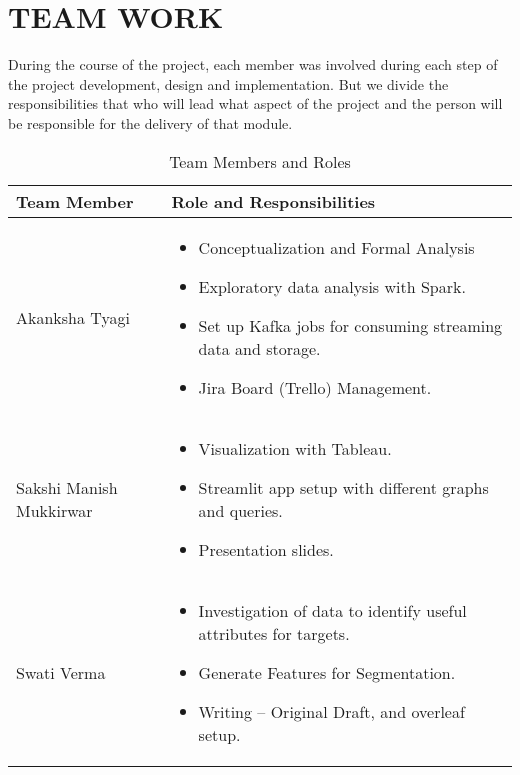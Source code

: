 \documentclass[conference]{IEEEtran}
\begin{document}


\section{TEAM WORK}

During the course of the project, each member was involved during each step of the project development, design and implementation. But we divide the responsibilities that who will lead what aspect of the project and the person will be responsible for the delivery of that module. 

\begin{table}[h]
    \renewcommand{\arraystretch}{1.3}
  \small  %
  \caption{Team Members and Roles}
  \begin{tabular}{|p{1.0in}|p{2.0in}|}
    \hline
    \textbf{Team Member} & \textbf{Role and Responsibilities} \\
    \hline
    \hline
    Akanksha Tyagi & 
        \begin{itemize}
          \item Conceptualization and Formal Analysis
          \item Exploratory data analysis with Spark.
          \item Set up Kafka jobs for consuming streaming data and storage.
          \item Jira Board (Trello) Management.
        \end{itemize}
        \\
    
    \hline
    Sakshi Manish Mukkirwar & 
        \begin{itemize}
          \item Visualization with Tableau.
          \item Streamlit app setup with different graphs and queries.
          \item Presentation slides.
        \end{itemize}
        \\
        
    \hline
    Swati Verma & 
        \begin{itemize}
          \item Investigation of data to identify useful attributes for targets.
          \item Generate Features for Segmentation.
          \item Writing – Original Draft, and overleaf setup.
        \end{itemize}
        \\
    

\end{tabular}
\end{table}
\end{document}
